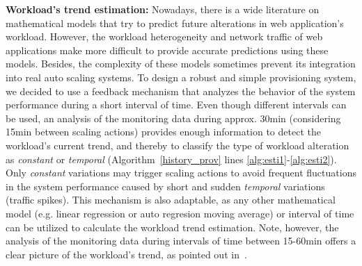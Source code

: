\textbf{Workload's trend estimation:} Nowadays, there is a wide literature on mathematical models that try to predict future alterations in web application's workload. However, the workload heterogeneity and network traffic of web applications make more difficult to provide accurate predictions using these models. Besides, the complexity of these models sometimes prevent its integration into real auto scaling systems. To design a robust and simple provisioning system, we decided to use a feedback mechanism that analyzes the behavior of the system performance during a short interval of time. Even though different intervals can be used, an analysis of the monitoring data during approx. 30min (considering 15min between scaling actions) provides enough information to detect the workload's current trend, and thereby to classify the type of workload alteration as \emph{constant} or \emph{temporal} (Algorithm~\ref{history_prov} lines \ref{alg:esti1}-\ref{alg:esti2}). Only \emph{constant} variations may trigger scaling actions to avoid frequent fluctuations in the system performance caused by short and sudden \emph{temporal} variations (traffic spikes). This mechanism is also adaptable, as any other mathematical model (e.g. linear regression or auto regresion moving average) or interval of time can be utilized to calculate the workload trend estimation. Note, however, the analysis of the monitoring data during intervals of time between 15-60min offers a clear picture of the workload's trend, as pointed out in~\cite{gandhi_hybrid_2012}.


